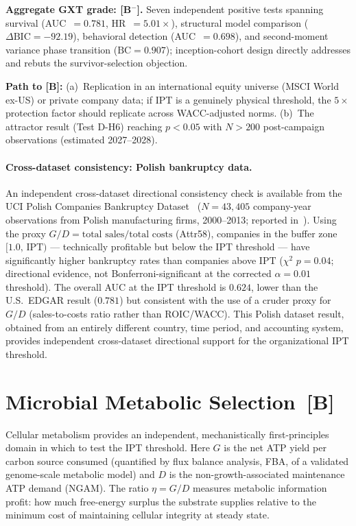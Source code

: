 \documentclass[11pt]{article}
\theoremstyle{remark}
\newcommand{\IPT}{\mathrm{IPT}}
\begin{document}
\textbf{Aggregate GXT grade: [B$^-$].}
Seven independent positive tests spanning survival (AUC~$= 0.781$, HR~$= 5.01\times$),
structural model comparison ($\Delta\mathrm{BIC} = -92.19$), behavioral detection
(AUC~$= 0.698$), and second-moment variance phase transition ($\mathrm{BC} = 0.907$);
inception-cohort design directly addresses and rebuts the survivor-selection objection.

\textbf{Path to [B]:}
(a)~Replication in an international equity universe (MSCI World ex-US) or private
company data; if IPT is a genuinely physical threshold, the $5\times$ protection
factor should replicate across WACC-adjusted norms.
(b)~The attractor result (Test D-H6) reaching $p < 0.05$ with $N > 200$ post-campaign
observations (estimated 2027--2028).

\paragraph{Cross-dataset consistency: Polish bankruptcy data.}
An independent cross-dataset directional consistency check is available
from the UCI Polish Companies Bankruptcy Dataset~\cite{ZiebaPolish2016}
($N = 43{,}405$ company-year observations from Polish manufacturing firms,
2000--2013; reported in~\cite{SpivackIPT}).
Using the proxy $G/D = \text{total sales}/\text{total costs}$ (Attr58),
companies in the buffer zone $[1.0,\,\IPT)$ --- technically profitable but
below the IPT threshold --- have significantly higher bankruptcy rates than
companies above $\IPT$ ($\chi^2$ $p = 0.04$; directional evidence, not
Bonferroni-significant at the corrected $\alpha = 0.01$ threshold).
The overall AUC at the IPT threshold is $0.624$, lower than the U.S.\ EDGAR
result ($0.781$) but consistent with the use of a cruder proxy for $G/D$
(sales-to-costs ratio rather than ROIC/WACC).
This Polish dataset result, obtained from an entirely different country,
time period, and accounting system, provides independent cross-dataset
directional support for the organizational IPT threshold.

\section{Microbial Metabolic Selection~\textbf{[B]}}
\label{sec:microbial}

Cellular metabolism provides an independent, mechanistically first-principles
domain in which to test the IPT threshold.
Here $G$ is the net ATP yield per carbon source consumed
(quantified by flux balance analysis, FBA, of a validated genome-scale metabolic
model) and $D$ is the non-growth-associated maintenance ATP demand (NGAM).
The ratio $\eta = G/D$ measures metabolic information profit: how much free-energy
surplus the substrate supplies relative to the minimum cost of maintaining
cellular integrity at steady state.
\end{document}
